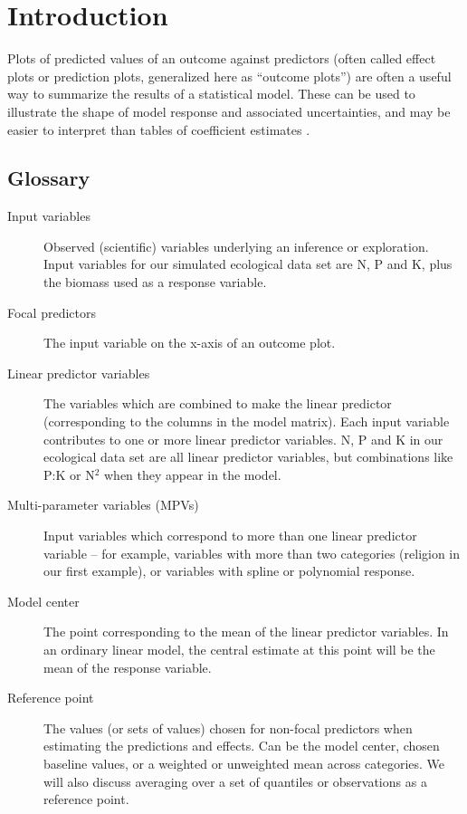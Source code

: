 
\section{Introduction}

Plots of predicted values of an outcome against predictors (often called effect plots or prediction plots, generalized here as “outcome plots”) are often a useful way to summarize the results of a statistical model. These can be used to illustrate the shape of model response and associated uncertainties, and may be easier to interpret than tables of coefficient estimates \citep{brambor_understanding_2006, berry_improving_2012, leeper2017interpreting}. 

\begin{gloss}
\subsection*{Glossary}
\begin{description}
\item [Input variables] Observed (scientific) variables underlying an inference or exploration. Input variables for our simulated ecological data set are N, P and K, plus the biomass used as a response variable.

\item [Focal predictors] The input variable on the x-axis of an outcome plot.

\item [Linear predictor variables] The variables which are combined to make the linear predictor (corresponding to the columns in the model matrix). Each input variable contributes to one or more linear predictor variables. N, P and K in our ecological data set are all linear predictor variables, but combinations like P:K or N$\mbox{}^2$ when they appear in the model.

\item[Multi-parameter variables (MPVs)] Input variables which correspond to more than one linear predictor variable -- for example, variables with more than two categories (religion in our first example), or variables with spline or polynomial response. 

\item [Model center] The point corresponding to the mean of the linear predictor variables. In an ordinary linear model, the central estimate at this point will be the mean of the response variable. 

\item [Reference point] The values (or sets of values) chosen for non-focal predictors when estimating the predictions and effects. Can be the model center, chosen baseline values, or a weighted or unweighted mean across categories. We will also discuss averaging over a set of quantiles or observations as a reference point.


\end{description}
\end{gloss}
